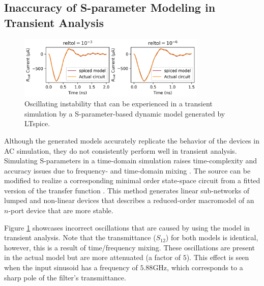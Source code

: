 \subsection{Inaccuracy of S-parameter Modeling in Transient Analysis}

\begin{figure}
    \centering
    \includegraphics[width=0.8\textwidth]{figs/td_LC_sad.png}
    \caption{Oscillating instability that can be experienced in a transient simulation
    by a S-parameter-based dynamic model generated by LTspice.}
    \label{fig:td_sparam_sad}
\end{figure}

Although the generated models accurately replicate the behavior of the devices in 
AC simulation, they do not consistently perform well in transient analysis.
Simulating S-parameters in a time-domain simulation raises 
time-complexity and accuracy issues due to frequency- and time-domain 
mixing \cite{td-fd-mixing}.
The  source can be modified to realize a corresponding 
minimal order state-space circuit from a fitted version of the transfer 
function \cite{arb-sparam-spice}.
This method generates linear sub-networks of lumped and non-linear devices
that describes a reduced-order macromodel of an $n$-port device that
are more stable.

Figure \ref{fig:td_sparam_sad} showcases incorrect oscillations that are caused by
using the  model in transient analysis. Note that the transmittance ($S_{12}$)
for both models is identical, however, this is a result of time/frequency mixing.
These oscillations are present in the actual model but are more attenuated (a factor
of $5$). This effect is seen when the input sinusoid has a frequency of $5.88$GHz,
which corresponds to a sharp pole of the filter's transmittance.


